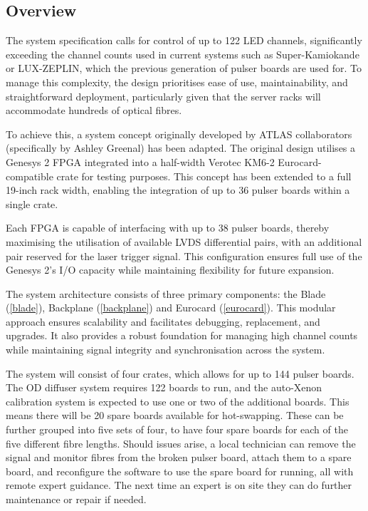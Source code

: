 \documentclass[a4paper,11pt]{article}
\begin{document}
\subsection{Overview}

The system specification calls for control of up to 122 LED channels, significantly exceeding the channel counts used in current systems such as Super-Kamiokande or LUX-ZEPLIN, which the previous generation of pulser boards are used for. To manage this complexity, the design prioritises ease of use, maintainability, and straightforward deployment, particularly given that the server racks will accommodate hundreds of optical fibres.

To achieve this, a system concept originally developed by ATLAS collaborators (specifically by Ashley Greenal) has been adapted. The original design utilises a Genesys 2 FPGA integrated into a half-width Verotec KM6-2 \cite{KM6-2} Eurocard-compatible crate for testing purposes. This concept has been extended to a full 19-inch rack width, enabling the integration of up to 36 pulser boards within a single crate.

Each FPGA is capable of interfacing with up to 38 pulser boards, thereby maximising the utilisation of available LVDS differential pairs, with an additional pair reserved for the laser trigger signal. This configuration ensures full use of the Genesys 2’s I/O capacity while maintaining flexibility for future expansion.

The system architecture consists of three primary components: the Blade (\cref{blade}), Backplane (\cref{backplane}) and Eurocard (\cref{eurocard}). This modular approach ensures scalability and facilitates debugging, replacement, and upgrades. It also provides a robust foundation for managing high channel counts while maintaining signal integrity and synchronisation across the system.

The system will consist of four crates, which allows for up to 144 pulser boards. The OD diffuser system requires 122 boards to run, and the auto-Xenon calibration system is expected to use one or two of the additional boards. This means there will be 20 spare boards available for hot-swapping. These can be further grouped into five sets of four, to have four spare boards for each of the five different fibre lengths. Should issues arise, a local technician can remove the signal and monitor fibres from the broken pulser board, attach them to a spare board, and reconfigure the software to use the spare board for running, all with remote expert guidance. The next time an expert is on site they can do further maintenance or repair if needed.
\end{document}
